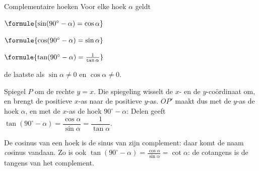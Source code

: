 \begin{theorie}
\begin{minipage}[t]{.64\linewidth}
\vspace{0pt}
\begin{stelling}{Complementaire hoeken}
Voor elke hoek $\alpha$ geldt

\vspace{1mm}
\qquad $\formule{\sin(90^\circ - \alpha) = \cos\alpha}$

\qquad $\formule{\cos(90^\circ - \alpha) = \sin\alpha}$

\qquad $\formule{\tan(90^\circ - \alpha) = \frac{1}{\tan\alpha}}$

\vspace{1mm}
de laatste als $\sin\alpha \neq 0$ en $\cos\alpha \neq 0$.
\end{stelling}

\begin{bewijs}
Spiegel $P$ om de rechte $y = x$. Die spiegeling wisselt de $x$- en de $y$-coördinaat om, en brengt de positieve $x$-as naar de positieve $y$-as. $OP'$ maakt dus met de $y$-as de hoek $\alpha$, en met de $x$-as de hoek $90^\circ - \alpha$:
Delen geeft $\tan(90^\circ - \alpha) = \dfrac{\cos\alpha}{\sin\alpha} = \dfrac{1}{\tan\alpha}$.
\end{bewijs}
\end{minipage}\hfill
\begin{minipage}[t]{.32\linewidth}
\vspace{3mm}
\centering
{}
\end{minipage}
\end{theorie}

De cosinus van een hoek is de sinus van zijn complement: daar komt de naam \textit{co}sinus vandaan. Zo is ook $\tan(90^\circ - \alpha) = \frac{\cos\alpha}{\sin\alpha} = \cot\alpha$: de cotangens is de tangens van het complement.

